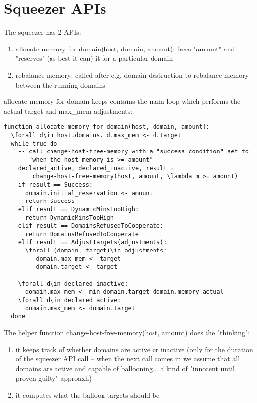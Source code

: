 \section{Squeezer APIs}
The squeezer has 2 APIs:
\begin{enumerate}
\item allocate-memory-for-domain(host, domain, amount): frees "amount" and "reserves" (as best it can) it for a particular domain
\item rebalance-memory: called after e.g. domain destruction to rebalance memory between the running domains
\end{enumerate}

allocate-memory-for-domain keeps contains the main loop which performs the actual target and max\_mem adjustments:
\begin{verbatim}
function allocate-memory-for-domain(host, domain, amount):
  \forall d\in host.domains. d.max_mem <- d.target
  while true do
    -- call change-host-free-memory with a "success condition" set to 
    -- "when the host memory is >= amount"
    declared_active, declared_inactive, result = 
        change-host-free-memory(host, amount, \lambda m >= amount)
    if result == Success:
      domain.initial_reservation <- amount
      return Success
    elif result == DynamicMinsTooHigh:
      return DynamicMinsTooHigh
    elif result == DomainsRefusedToCooperate:
      return DomainsRefusedToCooperate
    elif result == AdjustTargets(adjustments):
      \forall (domain, target)\in adjustments:
         domain.max_mem <- target
         domain.target <- target

    \forall d\in declared_inactive:
      domain.max_mem <- min domain.target domain.memory_actual
    \forall d\in declared_active:
      domain.max_mem <- domain.target
  done
\end{verbatim}
The helper function change-host-free-memory(host, amount) does the "thinking":
\begin{enumerate}
\item it keeps track of whether domains are active or inactive (only for the duration of the squeezer API call -- when the next 
  call comes in we assume that all domains are active and capable of ballooning... a kind of "innocent until proven guilty" approaxh)
\item it computes what the balloon targets should be
\end{enumerate}


